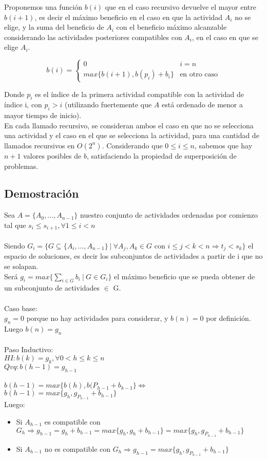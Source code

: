 \documentclass[10pt, a4paper]{article}
\begin{document}
Proponemos una función $b(i)$ que en el caso recursivo devuelve el mayor entre $b(i+1)$, es decir el máximo beneficio en el caso en que la actividad $A_i$ no se elige, y la suma del beneficio de $A_i$ con el beneficio máximo alcanzable considerando las actividades posteriores compatibles con $A_i$, en el caso en que se elige $A_i$.

$$b(i) = \begin{cases}
    0 & i = n \\
    max\{b(i+1), b(p_i) + b_i\} & \text{en otro caso}
\end{cases}$$

Donde $p_i$ es el índice de la primera actividad compatible con la actividad de índice i, con $p_i > i$ (utilizando fuertemente que $A$ está ordenado de menor a mayor tiempo de inicio). \\

En cada llamado recursivo, se consideran ambos el caso en que no se selecciona una actividad y el caso en el que se selecciona la actividad, para una cantidad de llamados recursivos en $O(2^n)$. Considerando que $0 \leq i \leq n$, sabemos que hay $n+1$ valores posibles de $b$, satisfaciendo la propiedad de superposición de problemas.

\subsection{Demostración}
Sea $A = \{A_0, ... , A_{n-1}\}$ nuestro conjunto de actividades ordenadas por comienzo tal que $s_i \leq s_{i+1},  \forall  1 \leq i < n$ \\ \\
Siendo $G_i = \{G \subseteq \{ A_i, ..., A_{n-1} \} \ | \ \forall A_j, A_k \in G$ con $i \leq j < k < n \Rightarrow t_j < s_k\}$ el espacio de soluciones, es decir los subconjuntos de actividades a partir de i que no se solapan.
\\
Será $g_i = max \{ \sum_{i \in G } b_i \ | \ G \in G_i\}$ el máximo beneficio que se pueda obtener de un subconjunto de actividades $\in$ G. \\ \\
Caso base: \\ $g_n = 0$ porque no hay actividades para considerar, y $b(n) = 0$ por definición. Luego $b(n) = g_n$\\ \\
Paso Inductivo:\\
$HI: b(k) = g_k, \forall 0 < h \leq k \leq n$\\
$Qvq: b(h-1) = g_{h-1}$
\\ \\
$b(h-1) = max \{b(h), b(P_{h-1} + b_{k-1} \} \Leftrightarrow$
\\
$b(h-1) = max \{g_h, g_{P_{h-1}} + b_{h-1} \}$
\\ Luego:
\begin{itemize}
    \item Si $A_{h-1}$ es compatible con $G_h \Rightarrow g_{h-1} = g_h + b_{h-1} = max\{g_h, g_h + b_{h-1}\} = max\{g_h, g_{P_{h-1}} + b_{h-1}\}$
    \item Si $A_{h-1}$ no es compatible con $G_h \Rightarrow g_{h-1} = max\{g_h, g_{P_{h-1}} + b_{h-1}\}$
\end{itemize}
\end{document}
